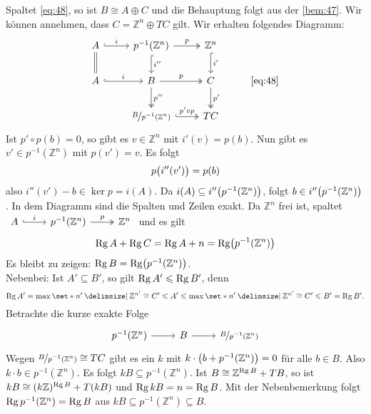 \begin{beweis}
	Spaltet \eqref{eq:48}, so ist $B \cong A \oplus C$ und die Behauptung folgt aus der \autoref{bem:47}.
	Wir können annehmen, dass $C = \mathbb{Z}^n \oplus T C$ gilt. Wir erhalten folgendes Diagramm: 
	\[
		\begin{tikzcd}
			A \rar["i",hook] \dar[equal] & p ^{-1}(\mathbb{Z}^n) \rar["p", two heads] \dar[hook,"i''"]& \mathbb{Z}^n \dar[hook,"i'"]\\
			A \rar["i",hook] & B \rar["p", two heads] \dar[two heads,"p''"]& C \dar[two heads,"p'"] & \text{\eqref{eq:48}}\\
			& \nicefrac{B}{p ^{-1}(\mathbb{Z}^n)} \rar[two heads, hook,"p' \circ p"]& T C
		\end{tikzcd} 
	\]
	Ist $p' \circ p(b)=0$, so gibt es $v \in \mathbb{Z}^n$ mit $i'(v)= p(b)$. Nun gibt es $v' \in p ^{-1}(\mathbb{Z}^n)$ mit $p(v')=v$. Es folgt 
	\[
		p \enbrace[\big]{i''(v')} = p(b) 
	\]
	also $i''(v') -b \in \ker p = i(A)$. Da $i(A) \subseteq i'' \enbrace*{p ^{-1} (\mathbb{Z}^n)}$, folgt $b \in i'' \enbrace*{p ^{-1}(\mathbb{Z}^n)}$.
	In dem Diagramm sind die Spalten und Zeilen exakt. Da $\mathbb{Z}^n$ frei ist, spaltet 
	$\begin{tikzcd}
		A \rar[hook,"i"] & p^{-1}(\mathbb{Z}^n) \rar["p", two heads] & \mathbb{Z}^n
	\end{tikzcd}$
	und es gilt 
	\[
		\Rg A + \Rg C = \Rg A + n = \Rg \enbrace*{p ^{-1}(\mathbb{Z}^n)} 
	\]
	Es bleibt zu zeigen: $\Rg B = \Rg  \enbrace*{p ^{-1}(\mathbb{Z}^n)}$. \medskip \\
	Nebenbei: Ist $A' \subseteq B'$, so gilt $\Rg A' \le \Rg B'$, denn 
	\[
		\Rg A' = \max \set*{n' \given \mathbb{Z}^{n'} \cong C' \le A'} \le \max \set*{n' \given \mathbb{Z}^{n'} \cong C' \le B'} = \Rg B'.
	\]
	Betrachte die kurze exakte Folge
	\[
		\begin{tikzcd}
			p^{-1}(\mathbb{Z}^n) \rar & B \rar & \nicefrac{B}{p ^{-1}(\mathbb{Z}^n)}
		\end{tikzcd}
	\]
	Wegen $\nicefrac{B}{p ^{-1}(\mathbb{Z}^n)} \cong T C$ gibt es ein
	$k$ mit $k \cdot \enbrace*{b+ p ^{-1}(\mathbb{Z}^n)} =0$ für alle $b \in B$. Also $k \cdot b \in p ^{-1}(\mathbb{Z}^n)$. Es folgt 
	$kB \subseteq  p ^{-1}(\mathbb{Z}^n)$. Ist  $B \cong \mathbb{Z}^{\Rg B}+ TB$, so ist $k B \cong (k \mathbb{Z})^{\Rg B}+ T(kB)$ und $\Rg kB = n = \Rg B$. 
	Mit der Nebenbemerkung folgt $\Rg p ^{-1}(\mathbb{Z}^n) = \Rg B$ aus $kB \subseteq  p ^{-1}(\mathbb{Z}^n) \subseteq B$.
\end{beweis}


